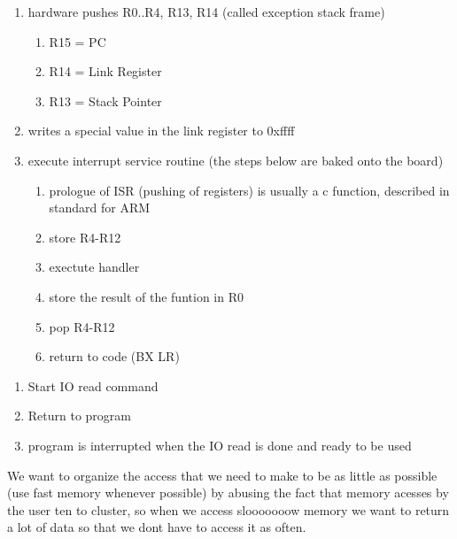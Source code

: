 \documentclass[12pt]{article}
\begin{document}
\begin{enumerate}
    \item hardware pushes R0..R4, R13, R14 (called exception stack frame)
    \begin{enumerate}
        \item R15 = PC
        \item R14 = Link Register
        \item R13 = Stack Pointer
    \end{enumerate}
    \item writes a special value in the link register to 0xffff
    \item execute interrupt service routine (the steps below are baked onto the board)
    \begin{enumerate}
        \item prologue of ISR (pushing of registers) is usually a c function, described in standard for ARM
        \item store R4-R12
        \item exectute handler
        \item store the result of the funtion in R0
        \item pop R4-R12
        \item return to code (BX LR)
    \end{enumerate}
\end{enumerate}








\begin{enumerate}
    \item Start IO read command
    \item Return to program
    \item program is interrupted when the IO read is done and ready to be used
\end{enumerate}







We want to organize the access that we need to make to be as little as possible (use fast memory whenever possible) by abusing the fact that memory acesses by the user ten to cluster, so when we access slooooooow memory we want to return a lot of data so that we dont have to access it as often.

\end{document}
